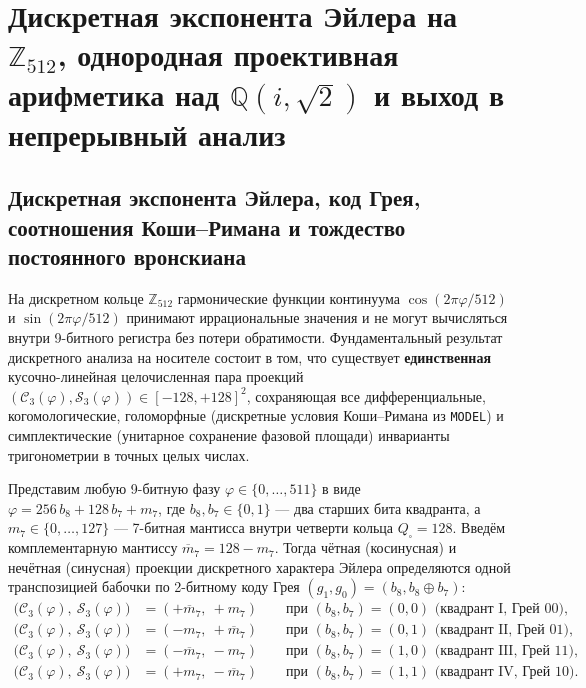 \chapter{Дискретная экспонента Эйлера на \texorpdfstring{$\mathbb{Z}_{512}$}{Z512}, однородная проективная арифметика над \texorpdfstring{$\mathbb{Q}(i,\sqrt{2})$}{Q(i, sqrt 2)} и выход в непрерывный анализ}
\label{ch:mono-rotator-calculus}

\section{Дискретная экспонента Эйлера, код Грея, соотношения Коши--Римана и тождество постоянного вронскиана}

На дискретном кольце $\mathbb{Z}_{512}$ гармонические функции континуума $\cos(2\pi\varphi/512)$ и $\sin(2\pi\varphi/512)$ принимают иррациональные значения и не могут вычисляться внутри 9-битного регистра без потери обратимости. Фундаментальный результат дискретного анализа на носителе состоит в том, что существует \textbf{единственная} кусочно-линейная целочисленная пара проекций $(\mathcal{C}_3(\varphi), \mathcal{S}_3(\varphi)) \in [-128, +128]^2$, сохраняющая все дифференциальные, когомологические, голоморфные (дискретные условия Коши--Римана из \texttt{MODEL}) и симплектические (унитарное сохранение фазовой площади) инварианты тригонометрии в точных целых числах.

Представим любую 9-битную фазу $\varphi \in \{0, \dots, 511\}$ в виде $\varphi = 256\,b_8 + 128\,b_7 + m_7$, где $b_8, b_7 \in \{0,1\}$ --- два старших бита квадранта, а $m_7 \in \{0, \dots, 127\}$ --- 7-битная мантисса внутри четверти кольца $Q_\square = 128$. Введём комплементарную мантиссу $\overline{m}_7 = 128 - m_7$. Тогда чётная (косинусная) и нечётная (синусная) проекции дискретного характера Эйлера определяются одной транспозицией бабочки по 2-битному коду Грея $(g_1, g_0) = (b_8, b_8 \oplus b_7)$:
\begin{align}
  \bigl(\mathcal{C}_3(\varphi),\ \mathcal{S}_3(\varphi)\bigr) &= (+\overline{m}_7,\ +m_7) \qquad \text{при } (b_8, b_7) = (0, 0) \text{ (квадрант I, Грей } 00\text{)}, \label{eq:mono-rotator-def} \\
  \bigl(\mathcal{C}_3(\varphi),\ \mathcal{S}_3(\varphi)\bigr) &= (-m_7,\ +\overline{m}_7) \qquad \text{при } (b_8, b_7) = (0, 1) \text{ (квадрант II, Грей } 01\text{)}, \nonumber \\
  \bigl(\mathcal{C}_3(\varphi),\ \mathcal{S}_3(\varphi)\bigr) &= (-\overline{m}_7,\ -m_7) \qquad \text{при } (b_8, b_7) = (1, 0) \text{ (квадрант III, Грей } 11\text{)}, \nonumber \\
  \bigl(\mathcal{C}_3(\varphi),\ \mathcal{S}_3(\varphi)\bigr) &= (+m_7,\ -\overline{m}_7) \qquad \text{при } (b_8, b_7) = (1, 1) \text{ (квадрант IV, Грей } 10\text{)}. \nonumber
\end{align}

